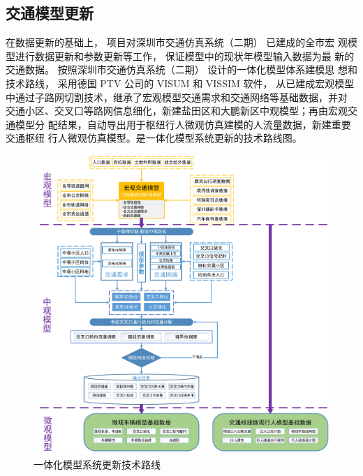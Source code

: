 \subsection{交通模型更新}
在数据更新的基础上， 项目对深圳市交通仿真系统（二期） 已建成的全市宏
观模型进行数据更新和参数更新等工作， 保证模型中的现状年模型输入数据为最
新的交通数据。 按照深圳市交通仿真系统（二期） 设计的一体化模型体系建模思
想和技术路线， 采用德国 PTV 公司的 VISUM 和 VISSIM 软件， 从已建成宏观模型
中通过子路网切割技术，继承了宏观模型交通需求和交通网络等基础数据，并对
交通小区、交叉口等路网信息细化，新建盐田区和大鹏新区中观模型；再由宏观交通模型分
配结果，自动导出用于枢纽行人微观仿真建模的人流量数据，新建重要交通枢纽
行人微观仿真模型。是一体化模型系统更新的技术路线图。

\begin{figure}[ht]
  \centering
  \includegraphics[width=\textwidth]{figures/chp01_一体化模型系统更新技术路线.pdf}
  \caption{一体化模型系统更新技术路线\label{fig:一体化模型系统更新技术路线} }
\end{figure}















